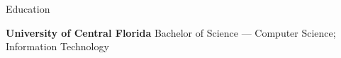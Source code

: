 \documentclass{resume} %
\begin{document}
\vspace{0.5em} %
\begin{rSection}{Education}
  
  {\bf University of Central Florida } Bachelor of Science --- Computer Science; Information Technology
  
\end{rSection}
\end{document}
